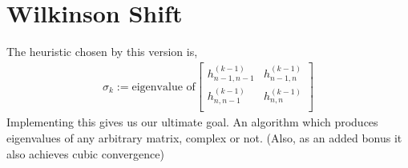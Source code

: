 \section{Wilkinson Shift}
The heuristic chosen by this version is,
\begin{align}
    \sigma_k := \text{eigenvalue of} \begin{bmatrix}
        h_{n-1, n-1}^{(k-1)} & h_{n-1, n}^{(k-1)}\\
        h_{n, n-1}^{(k-1)} & h_{n, n}^{(k-1)}\\
    \end{bmatrix}
\end{align}
Implementing this gives us our ultimate goal. An algorithm which produces eigenvalues of any arbitrary matrix, complex or not. (Also, as an added bonus it also achieves cubic convergence)
